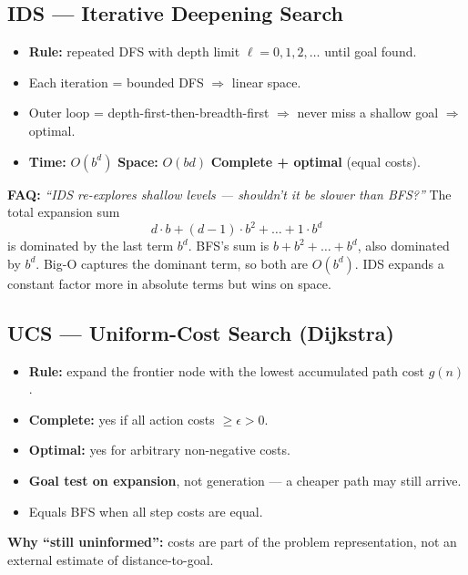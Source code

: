 \documentclass[11pt, a4paper]{article}
\begin{document}
\subsection{IDS — Iterative Deepening Search}

\begin{card}
\begin{itemize}
  \item \textbf{Rule:} repeated DFS with depth limit $\ell = 0, 1, 2, \dots$ until goal found.
  \item Each iteration = bounded DFS $\Rightarrow$ linear space.
  \item Outer loop = depth-first-then-breadth-first $\Rightarrow$ never miss a shallow goal $\Rightarrow$ optimal.
  \item \textbf{Time:} $O(b^d)$ \quad \textbf{Space:} $O(bd)$ \quad \textbf{Complete + optimal} (equal costs).
\end{itemize}
\end{card}

\textbf{FAQ:} \emph{``IDS re-explores shallow levels --- shouldn't it be slower than BFS?''} The total expansion sum
\[ d \cdot b + (d-1) \cdot b^2 + \dots + 1 \cdot b^d \]
is dominated by the last term $b^d$. BFS's sum is $b + b^2 + \dots + b^d$, also dominated by $b^d$. Big-O captures the dominant term, so both are $O(b^d)$. IDS expands a constant factor more in absolute terms but wins on space.

\subsection{UCS — Uniform-Cost Search (Dijkstra)}

\begin{card}
\begin{itemize}
  \item \textbf{Rule:} expand the frontier node with the lowest accumulated path cost $g(n)$.
  \item \textbf{Complete:} yes if all action costs $\ge \epsilon > 0$.
  \item \textbf{Optimal:} yes for arbitrary non-negative costs.
  \item \textbf{Goal test on expansion}, not generation --- a cheaper path may still arrive.
  \item Equals BFS when all step costs are equal.
\end{itemize}
\end{card}

\textbf{Why ``still uninformed'':} costs are part of the problem representation, not an external estimate of distance-to-goal.
\end{document}
